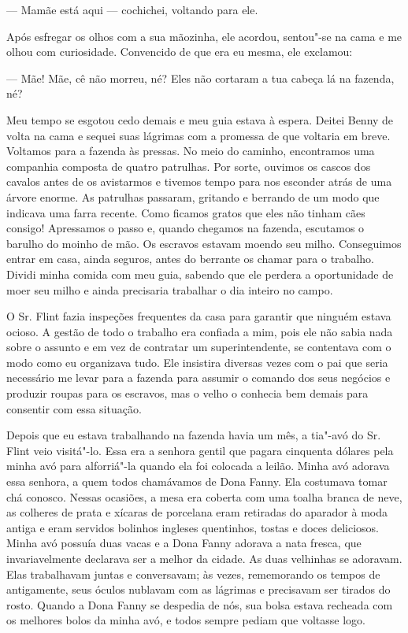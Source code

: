--- Mamãe está aqui --- cochichei, voltando para ele.

Após esfregar os olhos com a sua mãozinha, ele acordou, sentou"-se na
cama e me olhou com curiosidade. Convencido de que era eu mesma, ele
exclamou:

--- Mãe! Mãe, cê não morreu, né? Eles não cortaram a tua cabeça lá na
fazenda, né?

Meu tempo se esgotou cedo demais e meu
guia estava à espera. Deitei Benny de volta na cama e sequei suas
lágrimas com a promessa de que voltaria em breve. Voltamos para a
fazenda às pressas. No meio do caminho, encontramos uma companhia
composta de quatro patrulhas. Por sorte, ouvimos os cascos dos cavalos
antes de os avistarmos e tivemos tempo para nos esconder atrás de uma
árvore enorme. As patrulhas passaram, gritando e berrando de um modo que
indicava uma farra recente. Como ficamos gratos que eles não tinham cães
consigo! Apressamos o passo e, quando chegamos na fazenda, escutamos o
barulho do moinho de mão. Os escravos estavam moendo seu milho.
Conseguimos entrar em casa, ainda seguros, antes do berrante os chamar
para o trabalho. Dividi minha comida com meu guia, sabendo que ele
perdera a oportunidade de moer seu milho e ainda precisaria trabalhar o
dia inteiro no campo.

O Sr. Flint fazia inspeções frequentes
da casa para garantir que ninguém estava ocioso. A gestão de todo o
trabalho era confiada a mim, pois ele não sabia nada sobre o assunto e
em vez de contratar um superintendente, se contentava com o modo como eu
organizava tudo. Ele insistira diversas vezes com o pai que seria
necessário me levar para a fazenda para assumir o comando dos seus
negócios e produzir roupas para os escravos, mas o velho o conhecia bem
demais para consentir com essa situação.

Depois
que eu estava trabalhando na fazenda havia um mês, a tia"-avó do Sr.
Flint veio visitá"-lo. Essa era a senhora gentil que pagara cinquenta
dólares pela minha avó para alforriá"-la quando ela foi colocada a
leilão. Minha avó adorava essa senhora, a quem todos chamávamos de Dona
Fanny. Ela costumava tomar chá conosco. Nessas ocasiões, a mesa era
coberta com uma toalha branca de neve, as colheres de prata e xícaras de
porcelana eram retiradas do aparador à moda antiga e eram servidos
bolinhos ingleses quentinhos, tostas e doces deliciosos. Minha avó
possuía duas vacas e a Dona Fanny adorava a nata fresca, que
invariavelmente declarava ser a melhor da cidade. As duas velhinhas se
adoravam. Elas trabalhavam juntas e conversavam; às vezes, rememorando
os tempos de antigamente, seus óculos nublavam com as lágrimas e
precisavam ser tirados do rosto. Quando a Dona Fanny se despedia de nós,
sua bolsa estava recheada com os melhores bolos da minha avó, e todos
sempre pediam que voltasse logo.

